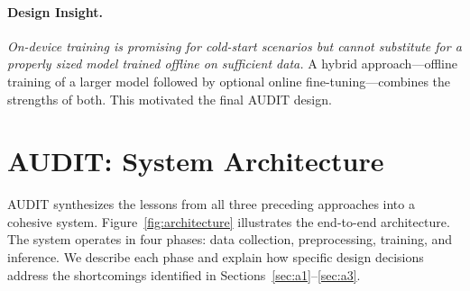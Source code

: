 \documentclass[letterpaper,twocolumn,10pt]{article}
\begin{document}
\paragraph{Design Insight.}
\emph{On-device training is promising for cold-start scenarios but
cannot substitute for a properly sized model trained offline on
sufficient data.}  A hybrid approach---offline training of a larger
model followed by optional online fine-tuning---combines the
strengths of both.  This motivated the final AUDIT design.



\section{AUDIT: System Architecture}
\label{sec:system}

AUDIT synthesizes the lessons from all three preceding approaches
into a cohesive system.  Figure~\ref{fig:architecture} illustrates
the end-to-end architecture.  The system operates in four phases:
data collection, preprocessing, training, and inference.  We
describe each phase and explain how specific design decisions
address the shortcomings identified in Sections~\ref{sec:a1}--\ref{sec:a3}.
\end{document}

